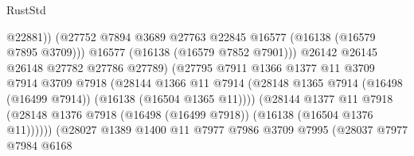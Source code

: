 \begin{lexlean}{RustStd}
\begin{coremodule}
                                            @22881))
                                        (@27752
                                          @7894
                                          @3689
                                          @27763
                                          @22845
                                          @16577
                                          (@16138 (@16579 @7895 @3709)))
                                        @16577
                                        (@16138 (@16579 @7852 @7901)))
                                      @26142
                                      @26145
                                      @26148
                                      @27782
                                      @27786
                                      @27789)
                                    (@27795
                                      @7911
                                      @1366
                                      @1377
                                      @11
                                      @3709
                                      @7914
                                      @3709
                                      @7918
                                      (@28144
                                        @1366
                                        @11
                                        @7914
                                        (@28148
                                          @1365
                                          @7914
                                          (@16498 (@16499 @7914))
                                          (@16138 (@16504 @1365 @11))))
                                      (@28144
                                        @1377
                                        @11
                                        @7918
                                        (@28148
                                          @1376
                                          @7918
                                          (@16498 (@16499 @7918))
                                          (@16138 (@16504 @1376 @11))))))
                                  (@28027
                                    @1389
                                    @1400
                                    @11
                                    @7977
                                    @7986
                                    @3709
                                    @7995
                                    (@28037
                                      @7977
                                      @7984
                                      @6168

\end{coremodule}
\end{lexlean}
